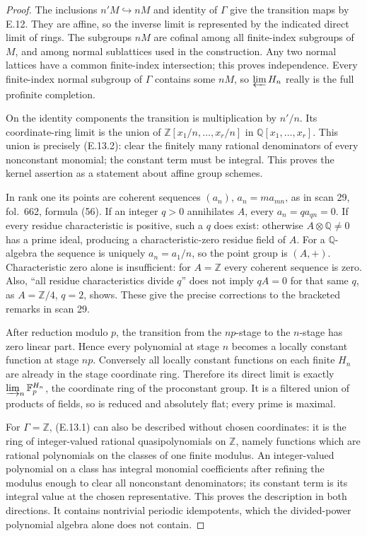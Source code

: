\begin{proof}
The inclusions \(n'M\hookrightarrow nM\) and identity of \(\Gamma\)
give the transition maps by E.12.  They are affine, so the inverse
limit is represented by the indicated direct limit of rings.
The subgroups \(nM\) are cofinal among all finite-index subgroups
of \(M\), and among normal sublattices used in the construction.
Any two normal lattices have a common finite-index intersection;
this proves independence.  Every finite-index normal subgroup of
\(\Gamma\) contains some \(nM\), so \(\varprojlim H_n\) really is
the full profinite completion.

On the identity components the transition is multiplication by
\(n'/n\).  Its coordinate-ring limit is the union of
\(\mathbb Z[x_1/n,\ldots,x_r/n]\) in \(\mathbb Q[x_1,\ldots,x_r]\).
This union is precisely (E.13.2): clear the finitely many rational
denominators of every nonconstant monomial; the constant term
must be integral.  This proves the kernel assertion as a statement
about affine group schemes.

In rank one its points are coherent sequences
\((a_n)\), \(a_n=m a_{mn}\), as in scan 29, fol.~662,
formula (56).  If an integer \(q>0\) annihilates \(A\),
every \(a_n=q a_{qn}=0\).  If every residue characteristic
is positive, such a \(q\) does exist: otherwise
\(A\otimes\mathbb Q\ne0\) has a prime ideal, producing a
characteristic-zero residue field of \(A\).
For a \(\mathbb Q\)-algebra the sequence is uniquely
\(a_n=a_1/n\), so the point group is \((A,+)\).
Characteristic zero alone is insufficient: for
\(A=\mathbb Z\) every coherent sequence is zero.
Also, ``all residue characteristics divide \(q\)'' does not
imply \(qA=0\) for that same \(q\), as
\(A=\mathbb Z/4\), \(q=2\), shows.  These give the precise
corrections to the bracketed remarks in scan 29.

After reduction modulo \(p\), the transition from the \(np\)-stage
to the \(n\)-stage has zero linear part.  Hence every polynomial
at stage \(n\) becomes a locally constant function at stage \(np\).
Conversely all locally constant functions on each finite \(H_n\)
are already in the stage coordinate ring.  Therefore its direct
limit is exactly
\(\varinjlim_n\mathbb F_p^{H_n}\), the coordinate ring of the
proconstant group.  It is a filtered union of products of fields,
so is reduced and absolutely flat; every prime is maximal.

For \(\Gamma=\mathbb Z\), (E.13.1) can also be described without
chosen coordinates: it is the ring of integer-valued rational
quasipolynomials on \(\mathbb Z\), namely functions which are
rational polynomials on the classes of one finite modulus.
An integer-valued polynomial on a class has integral monomial
coefficients after refining the modulus enough to clear all
nonconstant denominators; its constant term is its integral value
at the chosen representative.  This proves the description in
both directions.  It contains nontrivial periodic idempotents,
which the divided-power polynomial algebra alone does not contain.
\end{proof}


